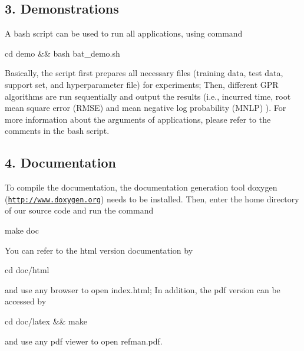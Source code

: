\subsection*{3. Demonstrations }

A bash script can be used to run all applications, using command \begin{DoxyVerb}cd demo && bash bat_demo.sh
\end{DoxyVerb}


Basically, the script first prepares all necessary files (training data, test data, support set, and hyperparameter file) for experiments; Then, different G\-P\-R algorithms are run sequentially and output the results (i.\-e., incurred time, root mean square error (R\-M\-S\-E) and mean negative log probability (M\-N\-L\-P) ). For more information about the arguments of applications, please refer to the comments in the bash script.

\subsection*{4. Documentation }

To compile the documentation, the documentation generation tool doxygen (\href{http://www.doxygen.org}{\tt http\-://www.\-doxygen.\-org}) needs to be installed. Then, enter the home directory of our source code and run the command \begin{DoxyVerb}make doc
\end{DoxyVerb}


You can refer to the html version documentation by \begin{DoxyVerb}cd doc/html 
\end{DoxyVerb}


and use any browser to open index.\-html; In addition, the pdf version can be accessed by \begin{DoxyVerb}cd doc/latex && make
\end{DoxyVerb}


and use any pdf viewer to open refman.\-pdf. 